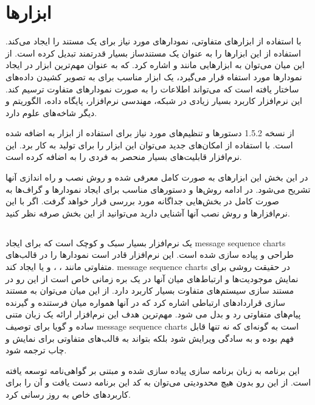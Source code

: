 

\section{ابزارها} 

 با استفاده از ابزارهای متفاوتی، نمودارهای مورد نیاز برای یک مستند
را ایجاد می‌کند. استفاده از این ابزارها  را به عنوان یک مستندساز
بسیار قدرتمند تبدیل کرده است. از این میان می‌توان به ابزارهایی مانند
 و  اشاره کرد.  که به عنوان مهم‌ترین ابزار
در ایجاد نمودارها مورد استفاه قرار می‌گیرد، یک ابزار مناسب برای به تصویر کشیدن
داده‌های ساختار یافته است که می‌تواند اطلاعات را به صورت نمودارهای متفاوت ترسیم
کند. این نرم‌افزار کاربرد بسیار زیادی در شبکه، مهندسی نرم‌افزار، پایگاه داده،
الگوریتم و دیگر شاخه‌های علوم دارد.

از نسخه 1.5.2 دستورها و تنظیم‌های مورد نیاز برای استفاده از ابزار  به
 اضافه شده است. با استفاده از امکان‌های جدید می‌توان این ابزار را
برای تولید  به کار برد. این نرم‌افزار قابلیت‌های
بسیار منحصر به فردی را به  اضافه کرده است.

در این بخش این ابزارهای به صورت کامل معرفی شده و روش نصب و راه اندازی آنها تشریح
می‌شود. در ادامه روش‌ها و دستورهای مناسب برای ایجاد نمودارها و 
گراف‌ها به صورت کامل در بخش‌هایی جداگانه مورد بررسی قرار خواهد گرفت. اگر با این
نرم‌افزارها و روش نصب آنها آشنایی دارید می‌توانید از این بخش صرفه نظر کنید.

\subsection{}

 یک نرم‌افزار بسیار سبک و کوچک است که برای ایجاد 
\glspl{message sequence chart} طراحی و پیاده سازی شده است. این نرم‌افزار قادر
است نمودارها را در قالب‌های متفاوتی مانند ، ، و یا 
ایجاد کند.
\glspl{message sequence chart} در حقیقت روشی برای نمایش موجودیت‌ها و ارتباط‌های
میان آنها در یک بره زمانی خاص است از این رو در مستند سازی سیستم‌های متفاوت 
بسیار کاربرد دارد. از این میان می‌توان به مستند سازی قراردادهای ارتباطی اشاره
کرد که در آنها همواره میان فرستنده و گیرنده پیام‌های متفاوتی رد و بدل می شود.
مهم‌ترین هدف این نرم‌افزار ارائه یک زبان متنی ساده و گویا برای توصیف
\glspl{message sequence chart} است به گونه‌ای که نه تنها قابل فهم بوده و به
سادگی ویرایش شود بلکه بتواند به قالب‌های متفاوتی برای نمایش و چاب ترجمه شود.


این برنامه به زبان برنامه سازی  پیاده سازی شده و مبتنی بر گواهی‌نامه
 توسعه یافته است. از این رو بدون هیچ محدودیتی می‌توان به کد این برنامه
دست یافت و آن را برای کاربردهای خاص به روز رسانی کرد.

